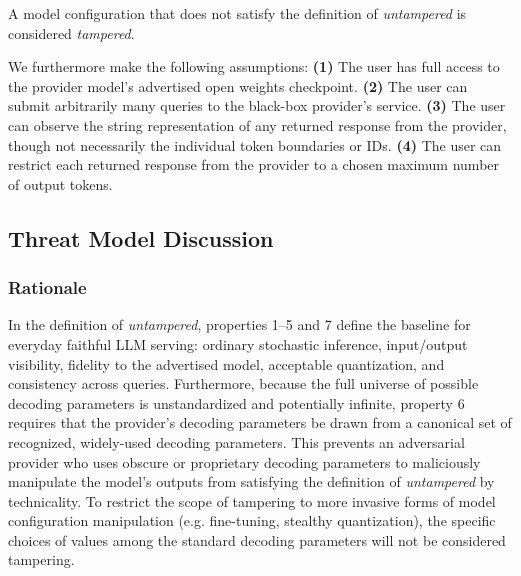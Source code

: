 \documentclass{article}
\begin{document}
A model configuration that does not satisfy the definition of \emph{untampered} is considered \emph{tampered}.

We furthermore make the following assumptions:
\noindent \textbf{(1)} The user has full access to the provider model's advertised open
weights checkpoint. \textbf{(2)} The user can submit arbitrarily many queries to the
black-box provider's service. \textbf{(3)} The user can observe the string representation
of any returned response from the provider, though not necessarily the
individual token boundaries or IDs. \textbf{(4)} The user can restrict each returned
response from the provider to a chosen maximum number of output tokens.


\subsection{Threat Model Discussion}
\subsubsection{Rationale}
In the definition of \emph{untampered}, properties 1--5 and 7 define the baseline for everyday faithful LLM serving: ordinary stochastic inference, input/output visibility, fidelity to the advertised model, acceptable quantization, and consistency across queries. Furthermore, because the full universe of possible decoding parameters is unstandardized and potentially infinite, property 6 requires that the provider's decoding parameters be drawn from a canonical set of recognized, widely-used decoding parameters. This prevents an adversarial provider who uses obscure or proprietary decoding parameters to maliciously manipulate the model's outputs from satisfying the definition of \emph{untampered} by technicality. To restrict the scope of tampering to more invasive forms of model configuration manipulation (e.g. fine-tuning, stealthy quantization), the specific choices of values among the standard decoding parameters will not be considered tampering.
\end{document}
